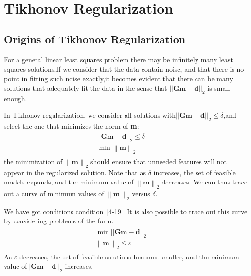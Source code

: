 \documentclass[a4paper]{article}
\newcommand{\tmem}[1]{{\em #1\/}}
\newcommand{\tmmathbf}[1]{\ensuremath{\boldsymbol{#1}}}
\newcommand{\tmstrong}[1]{\textbf{#1}}
\begin{document}
\section{Tikhonov Regularization}

\subsection{Origins of Tikhonov Regularization}

For a general linear least squares problem there may be infinitely many least
squares solutions.If we consider that the data contain noise, and that there
is no point in fitting such noise exactly,it becomes evident that there can be
many solutions that adequately fit the data in the sense that
$||\tmmathbf{G}\tmmathbf{m}-\tmmathbf{d}||_2$ is small enough.
\par
In Tikhonov regularization, we consider all solutions
with$||\tmmathbf{G}\tmmathbf{m}-\tmmathbf{d}||_2 \leqslant \delta$,and select
the one that minimizes the norm of {\tmstrong{m}}:
\begin{eqnarray}
  \begin{array}{l}
    ||\tmmathbf{G}\tmmathbf{m}-\tmmathbf{d}||_2 \leqslant \delta\\
    \min \left\| \tmmathbf{m} \right\|_2
  \end{array} &  &
  \label{4-19}
\end{eqnarray}
the minimization of $\left\| \tmmathbf{m} \right\|_2$ should ensure that
unneeded features will not appear in the regularized solution. Note that as
$\delta$ increases, the set of feasible models expands, and the minimum value
of $\left\| \tmmathbf{m} \right\|_2$ decreases. We can thus trace out a curve
of minimum values of $\left\| \tmmathbf{m} \right\|_2$ versus $\delta$.
\par

We have got conditions condition~\ref{4-19} .It is also possible to trace out this curve by considering problems of the form:
\begin{eqnarray}
  \begin{array}{l}
    \min ||\tmmathbf{G}\tmmathbf{m}-\tmmathbf{d}||_2\\
    \left\| \tmmathbf{m} \right\|_2 \leqslant \varepsilon
  \end{array} &  &
  \label{4-20}
\end{eqnarray}
As {\tmem{{\tmstrong{$\varepsilon${\tmem{}}}}}} decreases, the set of feasible
solutions becomes smaller, and the minimum value
of$||\tmmathbf{G}\tmmathbf{m}-\tmmathbf{d}||_2$ increases.
\par
\end{document}
